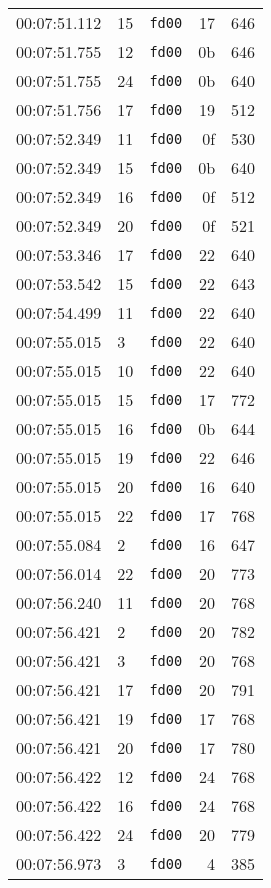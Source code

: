 \documentclass{article}
\begin{document}
\begin{longtable}{lllrr}
00:07:51.112 & 15 & \texttt{fd00} & 17 & 646 \\
00:07:51.755 & 12 & \texttt{fd00} & 0b & 646 \\
00:07:51.755 & 24 & \texttt{fd00} & 0b & 640 \\
00:07:51.756 & 17 & \texttt{fd00} & 19 & 512 \\
00:07:52.349 & 11 & \texttt{fd00} & 0f & 530 \\
00:07:52.349 & 15 & \texttt{fd00} & 0b & 640 \\
00:07:52.349 & 16 & \texttt{fd00} & 0f & 512 \\
00:07:52.349 & 20 & \texttt{fd00} & 0f & 521 \\
00:07:53.346 & 17 & \texttt{fd00} & 22 & 640 \\
00:07:53.542 & 15 & \texttt{fd00} & 22 & 643 \\
00:07:54.499 & 11 & \texttt{fd00} & 22 & 640 \\
00:07:55.015 & 3 & \texttt{fd00} & 22 & 640 \\
00:07:55.015 & 10 & \texttt{fd00} & 22 & 640 \\
00:07:55.015 & 15 & \texttt{fd00} & 17 & 772 \\
00:07:55.015 & 16 & \texttt{fd00} & 0b & 644 \\
00:07:55.015 & 19 & \texttt{fd00} & 22 & 646 \\
00:07:55.015 & 20 & \texttt{fd00} & 16 & 640 \\
00:07:55.015 & 22 & \texttt{fd00} & 17 & 768 \\
00:07:55.084 & 2 & \texttt{fd00} & 16 & 647 \\
00:07:56.014 & 22 & \texttt{fd00} & 20 & 773 \\
00:07:56.240 & 11 & \texttt{fd00} & 20 & 768 \\
00:07:56.421 & 2 & \texttt{fd00} & 20 & 782 \\
00:07:56.421 & 3 & \texttt{fd00} & 20 & 768 \\
00:07:56.421 & 17 & \texttt{fd00} & 20 & 791 \\
00:07:56.421 & 19 & \texttt{fd00} & 17 & 768 \\
00:07:56.421 & 20 & \texttt{fd00} & 17 & 780 \\
00:07:56.422 & 12 & \texttt{fd00} & 24 & 768 \\
00:07:56.422 & 16 & \texttt{fd00} & 24 & 768 \\
00:07:56.422 & 24 & \texttt{fd00} & 20 & 779 \\
00:07:56.973 & 3 & \texttt{fd00} & 4 & 385 \\

\end{longtable}
\end{document}
